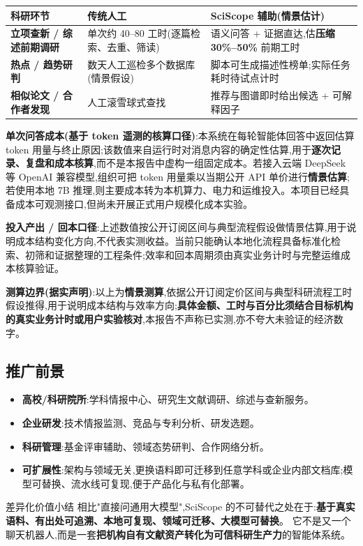\begin{tableblock}
\begin{tabularx}{0.96\textwidth}{>{\bfseries}p{30mm}X X}
\toprule
科研环节 & 传统人工 & SciScope 辅助(情景估计) \\
\midrule
立项查新 / 综述前期调研 & 单次约 40--80 工时(逐篇检索、去重、筛读) & 语义问答 + 证据直达,估\textbf{压缩 30\%--50\%} 前期工时 \\
热点 / 趋势研判 & 数天人工巡检多个数据库(情景假设) & 脚本可生成描述性榜单;实际任务耗时待试点计时 \\
相似论文 / 合作者发现 & 人工滚雪球式查找 & 推荐与图谱即时给出候选 + 可解释因子 \\
\bottomrule
\end{tabularx}
\end{tableblock}

\textbf{单次问答成本(基于 token 遥测的核算口径)}:本系统在每轮智能体回答中返回估算 token 用量与终止原因;该数值来自运行时对消息内容的确定性估算,用于\textbf{逐次记录、复盘和成本核算},而不是本报告中虚构一组固定成本。若接入云端 DeepSeek 等 OpenAI 兼容模型,组织可把 token 用量乘以当期公开 API 单价进行\textbf{情景估算};若使用本地 7B 推理,则主要成本转为本机算力、电力和运维投入。本项目已经具备成本可观测接口,但尚未开展正式用户规模化成本实验。

\begin{plainbox}
\textbf{投入产出 / 回本口径}:上述数值按公开订阅区间与典型流程假设做情景估算,用于说明成本结构变化方向,不代表实测收益。当前只能确认本地化流程具备标准化检索、初筛和证据整理的工程条件;效率和回本周期须由真实业务计时与完整运维成本核算验证。
\end{plainbox}

\begin{plainbox}
\textbf{测算边界(据实声明)}:以上为\textbf{情景测算},依据公开订阅定价区间与典型科研流程工时假设推得,用于说明成本结构与效率方向;\textbf{具体金额、工时与百分比须结合目标机构的真实业务计时或用户实验核对},本报告不声称已实测,亦不夸大未验证的经济数字。
\end{plainbox}

\subsection{推广前景}
\begin{itemize}
\item \textbf{高校/科研院所}:学科情报中心、研究生文献调研、综述与查新服务。
\item \textbf{企业研发}:技术情报监测、竞品与专利分析、研发选题。
\item \textbf{科研管理}:基金评审辅助、领域态势研判、合作网络分析。
\item \textbf{可扩展性}:架构与领域无关,更换语料即可迁移到任意学科或企业内部文档库;模型可替换、流水线可复现,便于产品化与私有化部署。
\end{itemize}

\begin{reportbox}{差异化价值小结}
相比"直接问通用大模型",SciScope 的不可替代之处在于:\textbf{基于真实语料、有出处可追溯、本地可复现、领域可迁移、大模型可替换}。
它不是又一个聊天机器人,而是一套\textbf{把机构自有文献资产转化为可信科研生产力}的智能体系统。
\end{reportbox}
